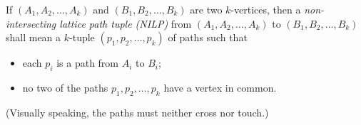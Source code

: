 \documentclass[reqno]{amsart}
\newcommand{\0}{\phantom{c}}
\DeclareMathOperator{\wt}{wt} %
\let\sumnonlimits\sum
\renewcommand{\sum}{\sumnonlimits\limits}
\newcommand{\set}[1]{\left\{ #1 \right\}}
\newcommand{\tup}[1]{\left( #1 \right)}
\newcommand{\defn}[1]{{\color{darkred}\emph{#1}}} %
\theoremstyle{plain}
\theoremstyle{definition}
\numberwithin{equation}{section}
\begin{document}
\begin{comment}
We begin with a proof of~\eqref{eq.LGV.single-paths}, which is a simple and classical fact that appears implicitly in various texts on enumerative combinatorics (\textit{e.g.}, \cite[(2.36)]{Stanley-EC1}).

\begin{proof}[Proof of~\eqref{eq.LGV.single-paths}.]
Let $A = (a,b)$ and $B = (c,d)$ be two vertices.
If $p$ is a path from $A$ to $B$, then $p$ must have exactly $c-a$ east-steps, and the $y$-coordinates of these
east-steps must belong to the interval $\set{b,b+1,\dotsc,d}$.
Let $\bigl( y_1(p), y_2(p), \dotsc, y_{c-a}(p) \bigr) \in \set{b,b+1, \dotsc, d}^{c-a}$ be the weakly increasing $(c-a)$-tuple consisting of the $y$-coordinates of the $c-a$ east-steps of $p$ (from left to right).
Moreover, $p$ can be uniquely reconstructed from this $(c-a)$-tuple (since this $(c-a)$-tuple determines the east-steps of $p$).
Conversely, any weakly increasing $(c-a)$-tuple of elements of $\set{b, b+1, \dotsc,d}$ has the form $\bigl( y_1(p), y_2(p), \dotsc, y_{c-a}(p) \bigr)$ for a unique path $p$ from $A$ to $B$.
Thus, there is a bijection between the paths $p$ from $A$ to $B$ and the weakly increasing $(c-a)$-tuples of elements of $\set{b, b+1, \dotsc, d}$.
This yields
\begin{align*}
\sum_{p \in N(A,B)} \wt(p) & = \sum_{\substack{ \tup{k_1,k_2,\ldots,k_{c-a}} \text{ is a weakly increasing} \\ (c-a)\text{-tuple of elements of }\set{b,b+1,\dotsc,d} }} x_{k_1} x_{k_2} \cdots x_{k_{c-a}}
\\ & = h_{c-a}(x_{b}, x_{b+1}, \dotsc, x_{d}).
\end{align*}
\end{proof}
\end{comment}

If $\tup{A_1, A_2, \dotsc, A_k}$ and $\tup{B_1, B_2, \dotsc, B_k}$ are two $k$-vertices, then a \defn{non-intersecting lattice path tuple (NILP)} from $\tup{A_1, A_2, \dotsc, A_k}$ to $\tup{B_1, B_2, \dotsc, B_k}$ shall mean a $k$-tuple $\tup{p_1, p_2, \dotsc, p_k}$ of paths such that
\begin{itemize}
\item each $p_i$ is a path from $A_i$ to $B_i$;
\item no two of the paths $p_1, p_2, \dotsc, p_k$ have a vertex in common.
\end{itemize}
(Visually speaking, the paths must neither cross nor touch.)
\end{document}
